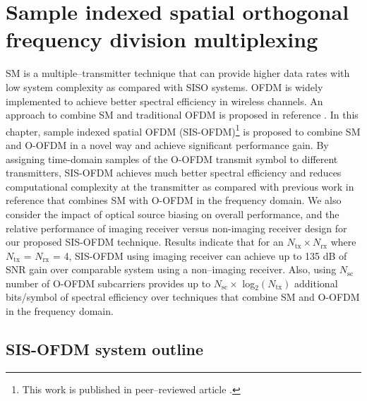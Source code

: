 \chapter[Optical spatial MIMO: Sample indexed spatial orthogonal frequency division multiplexing]{Sample indexed spatial orthogonal frequency division multiplexing}
\label{chapter:sisofdm}
\thispagestyle{myheadings}



\graphicspath{{_MIMOSpace/figures_sisofdm/}}

SM is a multiple--transmitter technique that can provide higher data rates with low system complexity as compared with SISO systems. OFDM is widely implemented to achieve better spectral efficiency in wireless channels. An approach to combine SM and traditional OFDM is proposed in reference \cite{gan06a}. In this chapter, sample indexed spatial OFDM (SIS-OFDM)\footnote{This work is published in peer--reviewed article \cite{but14b}.} is proposed to combine SM and O-OFDM in a novel way and achieve significant performance gain. By assigning time-domain samples of the O-OFDM transmit symbol to different transmitters, SIS-OFDM achieves much better spectral efficiency and reduces computational complexity at the transmitter as compared with previous work in reference \cite{zha12a} that combines SM with O-OFDM in the frequency domain. We also consider the impact of optical source biasing on overall performance, and the relative performance of imaging receiver versus non-imaging receiver design for our proposed SIS-OFDM technique. Results indicate that for an $N_{\text{tx}}\times N_{\text{rx}}$ where $N_{\text{tx}}$ = $N_{\text{rx}}$ = 4, SIS-OFDM using imaging receiver can achieve up to 135 dB of SNR gain over comparable system using a non--imaging receiver. Also, using $N_{\text{sc}}$ number of O-OFDM subcarriers provides up to $N_{\text{sc}}\times$ log$^{ }_{2}(N_{\text{tx}})$ additional bits/symbol of spectral efficiency over techniques that combine SM and O-OFDM in the frequency domain.

\section{SIS-OFDM system outline}
\label{subsec:sisofdmSystem}

